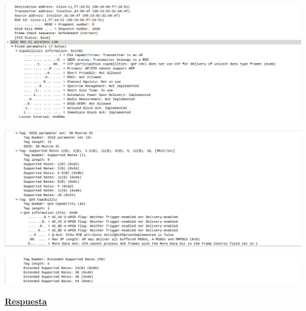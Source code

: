 \documentclass{article}
\begin{document}
\begin{center}
\includegraphics[scale=0.3]{WLAN/assreq5.png}
\end{center}
\begin{center}
\includegraphics[scale=0.3]{WLAN/assreq6.png}
\end{center}
\begin{center}
\includegraphics[scale=0.3]{WLAN/assreq7.png}
\end{center}

\textbf{\underline{Respuesta}}
\end{document}
